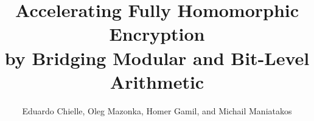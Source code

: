 \documentclass[sigconf]{acmart}
\begin{document}
\title[Accelerating Fully Homomorphic Encryption by Bridging Modular and Bit-Level Arithmetic]
{Accelerating Fully Homomorphic Encryption\\by Bridging Modular and Bit-Level Arithmetic}


\author{Eduardo Chielle, Oleg Mazonka, Homer Gamil, and Michail Maniatakos}









\maketitle












% 
\end{document}
